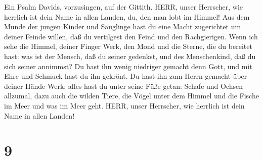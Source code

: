 Ein Psalm Davids, vorzusingen, auf der Gittith. HERR, unser
Herrscher, wie herrlich ist dein Name in allen Landen, du, den man lobt
im Himmel!  Aus dem Munde der jungen Kinder und Säuglinge
hast du eine Macht zugerichtet um deiner Feinde willen, daß du
vertilgest den Feind und den Rachgierigen.  Wenn ich sehe
die Himmel, deiner Finger Werk, den Mond und die Sterne, die du bereitet
hast:  was ist der Mensch, daß du seiner gedenkst, und des
Menschenkind, daß du sich seiner annimmst?  Du hast ihn
wenig niedriger gemacht denn Gott, und mit Ehre und Schmuck hast du ihn
gekrönt.  Du hast ihn zum Herrn gemacht über deiner Hände
Werk; alles hast du unter seine Füße getan:  Schafe und
Ochsen allzumal, dazu auch die wilden Tiere,  die Vögel
unter dem Himmel und die Fische im Meer und was im Meer geht.
 HERR, unser Herrscher, wie herrlich ist dein Name in allen
Landen!

\hypertarget{section-8}{%
\section{9}\label{section-8}}


